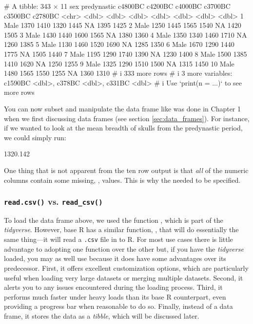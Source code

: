 \begin{outR}
# A tibble: 343 × 11
   sex   predynastic c4800BC c4200BC c4000BC c3700BC c3500BC c2780BC
   <chr>       <dbl>   <dbl>   <dbl>   <dbl>   <dbl>   <dbl>   <dbl>
 1 Male         1370    1410    1320    1445      NA    1395    1425
 2 Male         1250    1445    1565    1540      NA    1420    1505
 3 Male         1430    1440    1600    1565      NA    1380    1360
 4 Male         1350    1340    1460    1710      NA    1260    1385
 5 Male         1130    1460    1520    1690      NA    1285    1350
 6 Male         1670    1290    1440    1775      NA    1505    1440
 7 Male         1195    1290    1740    1390      NA    1230    1400
 8 Male         1500    1385    1410    1620      NA    1250    1255
 9 Male         1325    1290    1510    1500      NA    1315    1450
10 Male         1480    1565    1550    1255      NA    1360    1310
# i 333 more rows
# i 3 more variables: c1590BC <dbl>, c378BC <dbl>, c331BC <dbl>
# i Use `print(n = ...)` to see more rows
\end{outR}

You can now subset and manipulate the data frame  like was done in Chapter 1 when we first discussing data frames (see section \ref{sec:data_frames}). For instance, if we wanted to look at the mean breadth of skulls from the predynastic period, we could simply run:

\begin{outR}
[1] 1320.142
\end{outR}

\noindent
One thing that is not apparent from the ten row output is that \textit{all} of the numeric columns contain some missing, , values. This is why the  needed to be specified.

\subsubsection{\texttt{read.csv()} vs. \texttt{read\_csv()}}

To load the  data frame above, we used the function , which is part of the \textit{tidyverse}. However, base R has a similar function, , that will do essentially the same thing—it will read a \texttt{.csv} file in to R. For most use cases there is little advantage to adopting one function over the other but, if you have the \textit{tidyverse} loaded, you may as well use  because it does have some advantages over its predecessor. First, it offers excellent customization options, which are particularly useful when loading very large datasets or merging multiple datasets. Second, it alerts you to any issues encountered during the loading process. Third, it performs much faster under heavy loads than its base R counterpart, even providing a progress bar when reasonable to do so. Finally, instead of a data frame, it stores the data as a \textit{tibble}, which will be discussed later.

